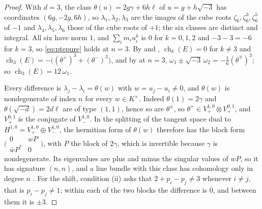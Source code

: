 \documentclass[11pt,reqno]{amsart}
\theoremstyle{plain}
\theoremstyle{definition}
\theoremstyle{remark}
\DeclareMathOperator{\ch}{ch}
\begin{document}
\begin{proof}
With $d=3$, the class $\theta(u)=2g\gamma+6h\ell$ of $u=g+h\sqrt{-3}$ has
coordinates $(6g,-2g,6h)$, so $\lambda_{1},\lambda_{2},\lambda_{3}$ are the
images of the cube roots $\zeta_{6},\zeta_{6}^{3},\zeta_{6}^{5}$ of $-1$ and
$\lambda_{4},\lambda_{5},\lambda_{6}$ those of the cube roots of $+1$; the six
classes are distinct and integral. All six have norm $1$, and
$\sum_{i}m_{i}u_{i}^{k}$ is $0$ for $k=0,1,2$ and $-3-3=-6$ for $k=3$, so
\eqref{eq:ptepure} holds at $n=3$. By  and
, $\ch_{k}(E)=0$ for $k\ne3$ and
$\ch_{3}(E)=-\bigl((\theta^{+})^{3}+(\theta^{-})^{3}\bigr)$, and by
\cite[Example~15.3]{paperI} at $n=3$,
$\omega_{1}\pm\sqrt{-3}\,\omega_{2}=-\frac16(\theta^{\mp})^{3}$; so
$\ch_{3}(E)=12\,\omega_{1}$.

Every difference is $\lambda_{j}-\lambda_{i}=\theta(w)$ with
$w=u_{j}-u_{i}\ne0$, and $\theta(w)$ is nondegenerate of index $n$ for every
$w\in K^{\times}$. Indeed $\theta(1)=2\gamma$ and $\theta(\sqrt{-d})=2d\ell$ are of
type $(1,1)$, hence so are $\theta^{\pm}$, so
$\theta^{+}\in V_{+}^{1,0}\otimes V_{+}^{0,1}$, and $V_{+}^{0,1}$ is the
conjugate of $V_{-}^{1,0}$. In the splitting of the tangent space dual to
$H^{1,0}=V_{+}^{1,0}\oplus V_{-}^{1,0}$, the hermitian form of $\theta(w)$
therefore has the block form
$\bigl(\begin{smallmatrix}0&wP\\ \bar wP^{*}&0\end{smallmatrix}\bigr)$, with $P$
the block of $2\gamma$, which is invertible because $\gamma$ is nondegenerate.
Its eigenvalues are plus and minus the singular values of $wP$, so it has
signature $(n,n)$, and a line bundle with this class has cohomology only in
degree $n$ \cite[Chapter~3]{BL04}. For the shift, condition (ii) asks that
$2+p_{i}-p_{j}\ne3$ whenever $i\ne j$, that is $p_{i}-p_{j}\ne1$; within each
of the two blocks the difference is $0$, and between them it is $\pm3$.


\end{proof}
\end{document}
